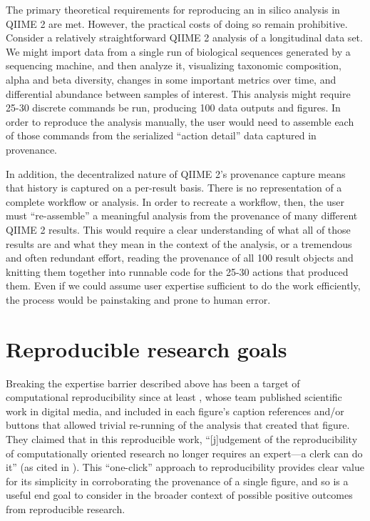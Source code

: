 The primary theoretical requirements for reproducing an in silico analysis in
QIIME 2 are met. However, the practical costs of doing so remain prohibitive.
Consider a relatively straightforward QIIME 2 analysis of a longitudinal data
set. We might import data from a single run of biological sequences generated by
a sequencing machine, and then analyze it, visualizing taxonomic composition,
alpha and beta diversity, changes in some important metrics over time, and
differential abundance between samples of interest. This analysis might require
25-30 discrete commands be run, producing 100 data outputs and figures. In order
to reproduce the analysis manually, the user would need to assemble each of
those commands from the serialized “action detail” data captured in provenance. 

In addition, the decentralized nature of QIIME 2’s provenance capture means that
history is captured on a per-result basis. There is no representation of a
complete workflow or analysis. In order to recreate a workflow, then, the user
must “re-assemble” a meaningful analysis from the provenance of many different
QIIME 2 results. This would require a clear understanding of what all of those
results are and what they mean in the context of the analysis, or a tremendous
and often redundant effort, reading the provenance of all 100 result objects and
knitting them together into runnable code for the 25-30 actions that produced
them. Even if we could assume user expertise sufficient to do the work
efficiently, the process would be painstaking and prone to human error. 


\section{Reproducible research goals}
\label{section:repro_goals}

Breaking the expertise barrier described above has been a target of
computational reproducibility since at least \textcite{claerbout_electronic_1992},
whose team published scientific work in digital media, and included in each figure’s
caption references and/or buttons that allowed trivial re-running of the
analysis that created that figure. They claimed that in this reproducible work,
“[j]udgement of the reproducibility of computationally oriented research no
longer requires an expert—a clerk can do it” (as cited in \cite[76]{plesser_reproducibility_2018}).
This “one-click” approach to reproducibility provides clear value for its
simplicity in corroborating the provenance of a single figure, and so is a
useful end goal to consider in the broader context of possible positive outcomes
from reproducible research.

